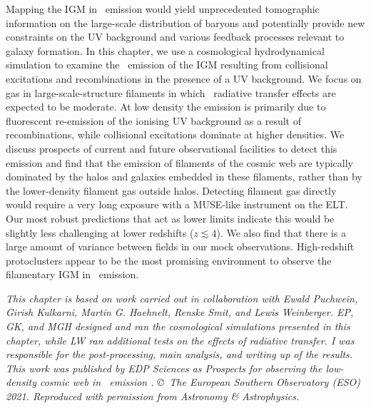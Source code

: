     \fancyhf{}
    \fancyfoot[C]{\color{white}\thepage}
    \newpage
    \setFancyHdr
\fi


\vspace*{\fill}

\noindent Mapping the IGM in \lya\ emission would yield unprecedented tomographic information on the large-scale distribution of baryons and potentially provide new constraints on the UV background and various feedback processes relevant to galaxy formation. In this chapter, we use a cosmological hydrodynamical simulation to examine the \lya\ emission of the IGM resulting from collisional excitations and recombinations in the presence of a UV background. We focus on gas in large-scale-structure filaments in which \lya\ radiative transfer effects are expected to be moderate. At low density the emission is primarily due to fluorescent re-emission of the ionising UV background as a result of recombinations, while collisional excitations dominate at higher densities. We discuss prospects of current and future observational facilities to detect this emission and find that the emission of filaments of the cosmic web are typically dominated by the halos and galaxies embedded in these filaments, rather than by the lower-density filament gas outside halos. Detecting filament gas directly would require a very long exposure with a MUSE-like instrument on the ELT. Our most robust predictions that act as lower limits indicate this would be slightly less challenging at lower redshifts ($z \lesssim 4$). We also find that there is a large amount of variance between fields in our mock observations. High-redshift protoclusters appear to be the most promising environment to observe the filamentary IGM in \lymana\ emission.

\vspace{3ex}
\begin{mdframed}[backgroundcolor=black!2.5]
    \textsl{This chapter is based on work carried out in collaboration with Ewald Puchwein, Girish Kulkarni, Martin G. Haehnelt, Renske Smit, and Lewis Weinberger. EP, GK, and MGH designed and ran the cosmological simulations presented in this chapter, while LW ran additional tests on the effects of radiative transfer. I was responsible for the post-processing, main analysis, and writing up of the results. This work was published by EDP Sciences as \textup{Prospects for observing the low-density cosmic web in \lymana\ emission} \citep[, Astronomy \& Astrophysics, 650, A98]{2021A&A...650A..98W}. \copyright\ The European Southern Observatory (ESO) 2021. Reproduced with permission from Astronomy \& Astrophysics.}
\end{mdframed}
\vspace*{\fill}


